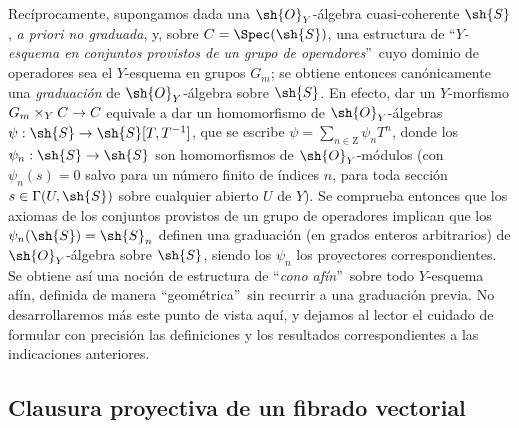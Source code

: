 \documentclass[oneside,10pt]{amsart}
\makeatletter
\newcommand{\ega@arrow}[2]{\mathchoice{#1}{#2}{#2}{#2}}
\renewcommand{\to}{\ega@arrow{\longrightarrow}{\rightarrow}}
\newcommand{\oldpage}[2][]{\marginnote{\normalfont\footnotesize\textbf{#1}~|~#2}\ignorespaces}
\let\EGAOriginalLabel\label
\renewcommand{\label}[1]{\phantomsection\EGAOriginalLabel{#1}}
\makeatother
\begin{document}
\begin{remark}[8.3.9]
Recíprocamente, supongamos dada una $\sh{O}_Y$-álgebra cuasi-coherente $\sh{S}$, \emph{a priori no graduada}, y, sobre $C=\Spec(\sh{S})$, una estructura de \textquotedblleft\emph{$Y$-esquema en conjuntos provistos de un grupo de operadores}\textquotedblright\ cuyo dominio de operadores sea el $Y$-esquema en grupos $G_m$;
se obtiene entonces canónicamente una \emph{graduación} de $\sh{O}_Y$-álgebra sobre $\sh{S}$.
En efecto, dar un $Y$-morfismo $G_m\times_Y C\to C$ equivale a dar un homomorfismo de $\sh{O}_Y$-álgebras $\psi:\sh{S}\to\sh{S}[T,T^{-1}]$, que se escribe $\psi=\sum_{n\in\mathrm{Z}}\psi_n T^n$, donde los $\psi_n:\sh{S}\to\sh{S}$ son homomorfismos de $\sh{O}_Y$-módulos (con $\psi_n(s)=0$ salvo para un número finito de índices $n$, para toda sección $s\in\Gamma(U,\sh{S})$ sobre cualquier abierto $U$ de $Y$).
Se comprueba entonces que los axiomas de los conjuntos provistos de un grupo de operadores implican que los $\psi_n(\sh{S})=\sh{S}_n$ definen una graduación (en grados enteros arbitrarios) de $\sh{O}_Y$-álgebra sobre $\sh{S}$, siendo los $\psi_n$ los proyectores correspondientes.
Se obtiene así una noción de estructura de \textquotedblleft\emph{cono afín}\textquotedblright\ sobre todo $Y$-esquema afín, definida de manera \textquotedblleft geométrica\textquotedblright\ sin recurrir a una graduación previa.
\oldpage[II]{168}
No desarrollaremos más este punto de vista aquí, y dejamos al lector el cuidado de formular con precisión las definiciones y los resultados correspondientes a las indicaciones anteriores.
\end{remark}
\subsection{Clausura proyectiva de un fibrado vectorial}
\label{subsection:II.8.4}
\end{document}
